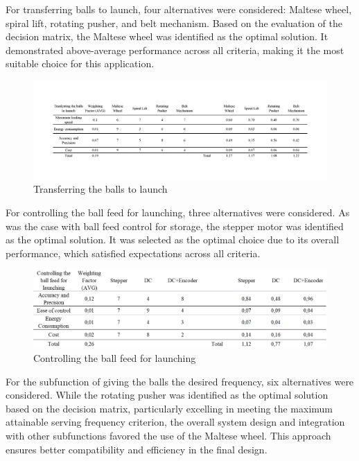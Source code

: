 \documentclass[12pt]{report}
\begin{document}
For transferring balls to launch, four alternatives were considered: Maltese wheel, spiral lift, rotating pusher, and belt mechanism. Based on the evaluation of the decision matrix, the Maltese wheel was identified as the optimal solution. It demonstrated above-average performance across all criteria, making it the most suitable choice for this application.

\begin{figure}[H]
    \centering
    \includegraphics[width=1\textwidth]{Decision matrices/transfer to launch.png}
    \caption{Transferring the balls to launch }
\end{figure}

For controlling the ball feed for launching, three alternatives were considered. As was the case with ball feed control for storage, the stepper motor was identified as the optimal solution. It was selected as the optimal choice due to its overall performance, which satisfied expectations across all criteria.

\begin{figure}[H]
    \centering
    \includegraphics[width=1\textwidth]{Decision matrices/controlling ball feed for launching.png}
    \caption{Controlling the ball feed for launching}
\end{figure}

For the subfunction of giving the balls the desired frequency, six alternatives were considered. While the rotating pusher was identified as the optimal solution based on the decision matrix, particularly excelling in meeting the maximum attainable serving frequency criterion, the overall system design and integration with other subfunctions favored the use of the Maltese wheel. This approach ensures better compatibility and efficiency in the final design.
\end{document}
